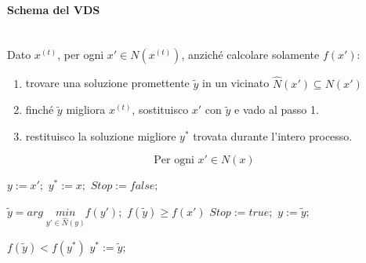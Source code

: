\documentclass{article}
\begin{document}
\paragraph{Schema del VDS}\mbox{}\\
Dato $x^{(t)}$, per ogni $x'\in N(x^{(t)})$, anziché calcolare solamente $f(x')$:
\begin{enumerate}
    \item trovare una soluzione promettente $\tilde{y}$ in un vicinato $\hat{N}(x')\subseteq N(x')$
    \item finché $\tilde{y}$ migliora $x^{(t)}$, sostituisco $x'$ con $\tilde{y}$ e vado al passo 1.
    \item restituisco la soluzione migliore $y^*$ trovata durante l'intero processo.
\end{enumerate}

$$\text{Per ogni }x'\in N(x)$$
\begin{algorithm}
    \begin{algorithmic}
    \caption{$Steepest\;descent$}
    \end{algorithmic}
\end{algorithm}

\begin{algorithm}[H]
    \caption{$Variable\;Depth\;Search$}
    \label{alg:vds}
    \begin{algorithmic}
        \State $y:=x';$
        \State $y^*:=x;$
        \State $Stop:=false;$

            \State $\tilde{y}=arg\;\underset{y'\in\hat{N}(y)}{min} f(y');$
            \If $f(\tilde{y})\geq f(x')$
                \State $Stop:=true;$
            \Else
                \State $y:=\tilde{y};$
            \EndIf

            \If $f(\tilde{y}) < f(y^*)$
                \State $y^*:=\tilde{y};$
            \EndIf
        \EndWhile
    \end{algorithmic}
\end{algorithm}
\end{document}
